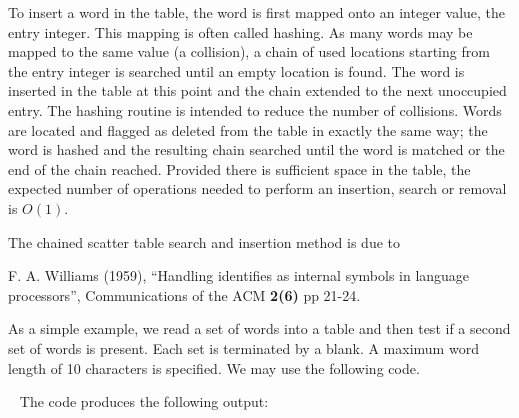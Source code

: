 \documentclass{galahad}
\begin{document}

\galmethod

To insert a word in the table, the word is first mapped onto an
integer value, the entry integer.  This mapping is often called
hashing. As many words may be mapped to the same value (a collision),
a chain of used locations starting from the entry integer is searched
until an empty location is found. The word is inserted in the table at
this point and the chain extended to the next unoccupied entry. The
hashing routine is intended to reduce the number of collisions.  Words
are located and flagged as deleted from the table in exactly the same
way; the word is hashed and the resulting chain searched until the
word is matched or the end of the chain reached.  Provided there is
sufficient space in the table, the expected number of operations
needed to perform an insertion, search or removal is $O(1)$.

\galreferences
\vspace*{1mm}

\noindent
The chained scatter table search and insertion method is due to
\vspace*{1mm}

\noindent
F. A.  Williams (1959),
``Handling identifies as internal symbols in language processors'',
Communications of the ACM {\bf 2(6)} pp 21-24.


\galexamples
As a simple example, we read a set of words into a table and then
test if a second set of words is present. Each set is terminated by a
blank.  A maximum word length of 10 characters is specified.  We may
use the following code.

{\tt \small
\VerbatimInput{\packageexample}
}
\noindent
The code produces the following output:
{\tt \small
\VerbatimInput{\packageresults}
}
\end{document}
